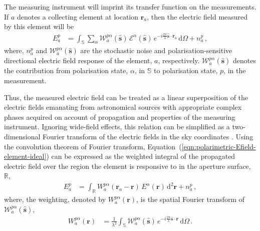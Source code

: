 \documentclass[
  journal=pasa,
  manuscript=article-type,
  year=2020,
  volume=37,
]{cup-journal}
\begin{document}
The measuring instrument will imprint its transfer function on the measurements. If $a$ denotes a collecting element at location $\boldsymbol{r}_{a}$, then the electric field measured by this element will be
\begin{align}
    E_{a}^p &= \int_\mathbb{S} \sum_\alpha  \mathcal{W}_{a}^{p\alpha}(\hat{\boldsymbol{s}})\, \mathcal{E}^\alpha(\hat{\boldsymbol{s}})\, e^{-i \frac{2\pi}{\lambda} \hat{\boldsymbol{s}}\cdot\boldsymbol{r}_{a}} \,\mathrm{d}\Omega + n_{a}^p \, , \label{eqn:polarimetric-Efield-element-ideal}
\end{align}
where, $n_{a}^p$ and $\mathcal{W}_{a}^{p\alpha}(\hat{\boldsymbol{s}})$ are the stochastic noise and polarisation-sensitive directional electric field response of the element, $a$, respectively. $\mathcal{W}_{a}^{p\alpha}(\hat{\boldsymbol{s}})$ denotes the contribution from polarisation state, $\alpha$, in $\mathbb{S}$ to polarisation state, $p$, in the measurement.

Thus, the measured electric field can be treated as a linear superposition of the electric fields emanating from astronomical sources with appropriate complex phases acquired on account of propagation and properties of the measuring instrument. Ignoring wide-field effects, this relation can be simplified as a two-dimensional Fourier transform of the electric fields in the sky coordinates \cite{TMS2017}. Using the convolution theorem of Fourier transform, Equation~(\ref{eqn:polarimetric-Efield-element-ideal}) can be expressed as the weighted integral of the propagated electric field over the region the element is responsive to in the aperture surface, $\mathbb{R}$, 
\begin{align}
    E_{a}^p &= \int_\mathbb{R} W_{a}^{p\alpha}(\boldsymbol{r}_{a} - \boldsymbol{r})\,E^\alpha(\boldsymbol{r}) \, \mathrm{d}^2 \boldsymbol{r}+ n_{a}^p \, , \label{eqn:polarimetric-Efield-element-ideal-aperture-continuous}
\end{align}
where, the weighting, denoted by $W_{a}^{p\alpha}(\boldsymbol{r})$, is the spatial Fourier transform of $\mathcal{W}_{a}^{p\alpha}(\hat{\boldsymbol{s}})$,
\begin{align}
    W_{a}^{p\alpha}(\boldsymbol{r}) &= \frac{1}{\lambda^2}\int_\mathbb{S} \mathcal{W}_{a}^{p\alpha}(\hat{\boldsymbol{s}})\, e^{-i\frac{2\pi}{\lambda} \hat{\boldsymbol{s}}\cdot \boldsymbol{r}} \,\mathrm{d}\Omega \, . \label{eqn:holographic-Efield-illumination}
\end{align}
\end{document}
